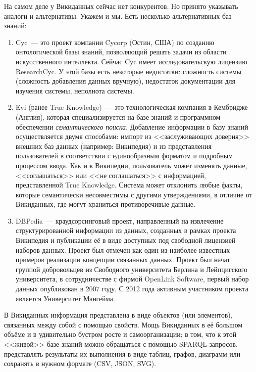 На самом деле у Викиданных сейчас нет конкурентов. Но принято указывать аналоги и альтернативы. Укажем и мы. Есть несколько альтернативных баз знаний:
\begin{enumerate}
\item Cyc~--- это проект компании Cycorp (Остин, США) по созданию онтологической базы знаний, позволяющий решать задачи из области искусственного интеллекта\autocite{Cyc}. Сейчас Cyc имеет исследовательскую лицензию ResearchCyc. У этой базы есть некоторые недостатки: сложность системы (сложность добавления данных
вручную), недостаток документации для изучения системы, неполнота системы.
\item Evi (ранее True Knowledge\autocite{True_Knowledge})~--- это технологическая компания в Кембридже (Англия), которая специализируется на базе знаний и программном обеспечении \textit{семантического поиска}\footnotemark.  Добавление информации в базу знаний осуществляется двумя способами: импорт из <<заслуживающих доверия>> внешних баз данных (например: Википедия) и из представления пользователей в соответствии с единообразным форматом и подробным процессом ввода. Как и в Википедии, пользователь может изменять
данные, <<соглашаться>> или <<не соглашаться>> с информацией, представленной True Knowledge. Система может отклонить любые факты, которые семантически несовместимы с другими утверждениями, в отличие от Викиданных, где могут
храниться противоречивые данные.
\item DBPedia~--- краудсорсинговый проект, направленный на извлечение структурированной информации из данных, созданных в рамках проекта Википедия и публикации её в виде доступных под свободной лицензией наборов данных. Проект был отмечен как один из наиболее известных примеров реализации концепции связанных данных.
Проект был начат группой добровольцев из Свободного университета Берлина и Лейпцигского университета, в сотрудничестве с фирмой OpenLink Software, первый набор данных опубликован в 2007 году. С 2012 года активным участником проекта является Университет Мангейма.
\end{enumerate}
В Викиданных информация представлена в виде объектов (или элементов), связанных между собой с помощью свойств\footnotemark {}. Мощь Викиданных в её большом объёме и в удивительно бустром росте и самоорганизации; в том, что к этой <<живой>> базе знаний можно обращаться с помощью  SPARQL-запросов, представлять результаты их выполнения в виде таблиц, графов, диаграмм или сохранять в нужном формате (CSV, JSON, SVG).

